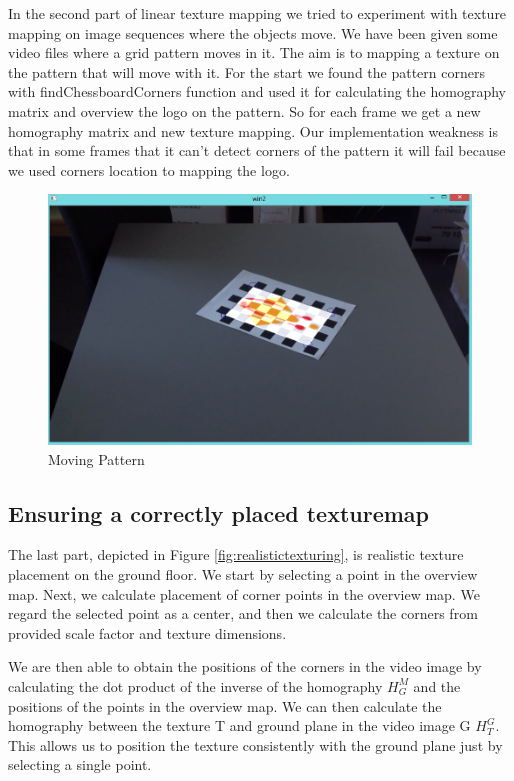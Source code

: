 In the second part of linear texture mapping we tried to experiment with texture mapping on image sequences where the objects move. We have been given some video files where a grid pattern moves in it. The aim is to mapping a texture on the pattern that will move with it. For the start we found the pattern corners with findChessboardCorners function and used it for calculating the homography matrix and overview the logo on the pattern. So for each frame we get a new homography matrix and new texture mapping. Our implementation weakness is that in some frames that it can't detect corners of the pattern it will fail because we used corners location to mapping the logo.

\begin{figure}[h!]
	\centering
	\includegraphics[width=\textwidth]{Handin2/images/linearmapping2.jpg}
	\caption{Moving Pattern}
	\label{fig:movingpattern}
\end{figure}

\subsection{Ensuring a correctly placed texturemap}

The last part, depicted in Figure \ref{fig:realistictexturing}, is realistic texture placement on the ground floor. We start by selecting a point in the overview map. Next, we calculate placement of corner points in the overview map. We regard the selected point as a center, and then we calculate the corners from provided scale factor and texture dimensions.

We are then able to obtain the positions of the corners in the video image by calculating the dot product of the inverse of the homography $H_{G}^{M}$ and the positions of the points in the overview map. We can then calculate the homography between the texture T and ground plane in the video image G $H_{T}^{G}$. This allows us to position the texture consistently with the ground plane just by selecting a single point.

